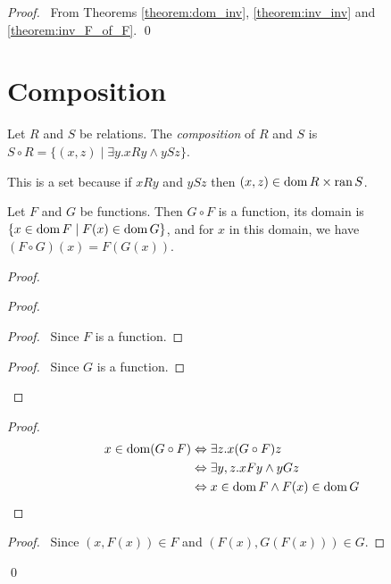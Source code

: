 \begin{proof}
    \pf\ From Theorems \ref{theorem:dom_inv}, \ref{theorem:inv_inv} and \ref{theorem:inv_F_of_F}. \qed
\end{proof}

\section{Composition}

\begin{definition}
    Let $R$ and $S$ be relations. The \emph{composition} of $R$ and $S$ is $S \circ R = \{ (x,z) \mid \exists y. xRy \wedge ySz \}$.
    
    This is a set because if $xRy$ and $ySz$ then $(x,z) \in \operatorname{dom} R \times \operatorname{ran} S$.
\end{definition}

\begin{theorem}
    \label{theorem:comp_function}
    Let $F$ and $G$ be functions. Then $G \circ F$ is a function, its domain
    is $\{ x \in \operatorname{dom} F \mid F(x) \in \operatorname{dom} G \}$, and for $x$ in this domain,
    we have $(F \circ G)(x) = F(G(x))$.
\end{theorem}

\begin{proof}
    \pf
    \begin{proof}
        \begin{proof}
            \pf\ Since $F$ is a function.
        \end{proof}
        \begin{proof}
            \pf\ Since $G$ is a function.
        \end{proof}
    \end{proof}
    \begin{proof}
        \pf
        \begin{align*}
            x \in \operatorname{dom} (G \circ F) & \Leftrightarrow \exists z. x(G \circ F)z \\
            & \Leftrightarrow \exists y, z. xFy \wedge yGz \\
            & \Leftrightarrow x \in \operatorname{dom} F \wedge F(x) \in \operatorname{dom} G
        \end{align*}
    \end{proof}
    \begin{proof}
        \pf\ Since $(x,F(x)) \in F$ and $(F(x),G(F(x))) \in G$.
    \end{proof}
    \qed
\end{proof}

